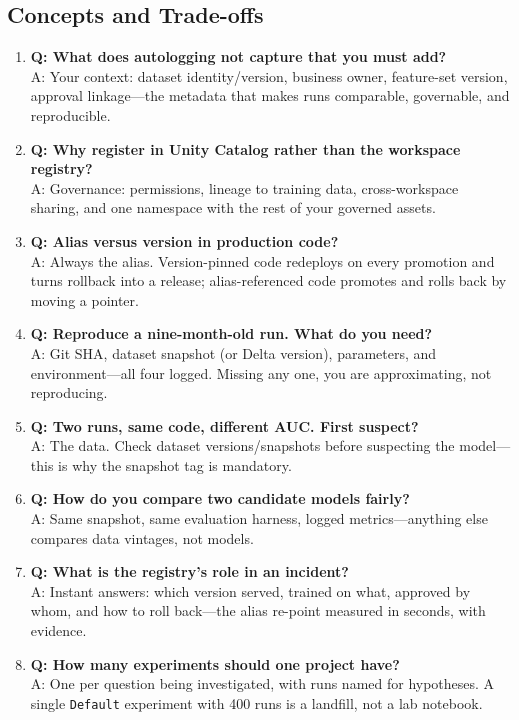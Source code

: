 \subsection{Concepts and Trade-offs}
\begin{enumerate}
    \item \textbf{Q: What does autologging not capture that you must add?}\\
    A: Your context: dataset identity/version, business owner, feature-set version, approval linkage---the metadata that makes runs comparable, governable, and reproducible.
    \item \textbf{Q: Why register in Unity Catalog rather than the workspace registry?}\\
    A: Governance: permissions, lineage to training data, cross-workspace sharing, and one namespace with the rest of your governed assets.
    \item \textbf{Q: Alias versus version in production code?}\\
    A: Always the alias. Version-pinned code redeploys on every promotion and turns rollback into a release; alias-referenced code promotes and rolls back by moving a pointer.
    \item \textbf{Q: Reproduce a nine-month-old run. What do you need?}\\
    A: Git SHA, dataset snapshot (or Delta version), parameters, and environment---all four logged. Missing any one, you are approximating, not reproducing.
    \item \textbf{Q: Two runs, same code, different AUC. First suspect?}\\
    A: The data. Check dataset versions/snapshots before suspecting the model---this is why the snapshot tag is mandatory.
    \item \textbf{Q: How do you compare two candidate models fairly?}\\
    A: Same snapshot, same evaluation harness, logged metrics---anything else compares data vintages, not models.
    \item \textbf{Q: What is the registry's role in an incident?}\\
    A: Instant answers: which version served, trained on what, approved by whom, and how to roll back---the alias re-point measured in seconds, with evidence.
    \item \textbf{Q: How many experiments should one project have?}\\
    A: One per question being investigated, with runs named for hypotheses. A single \texttt{Default} experiment with 400 runs is a landfill, not a lab notebook.
\end{enumerate}

